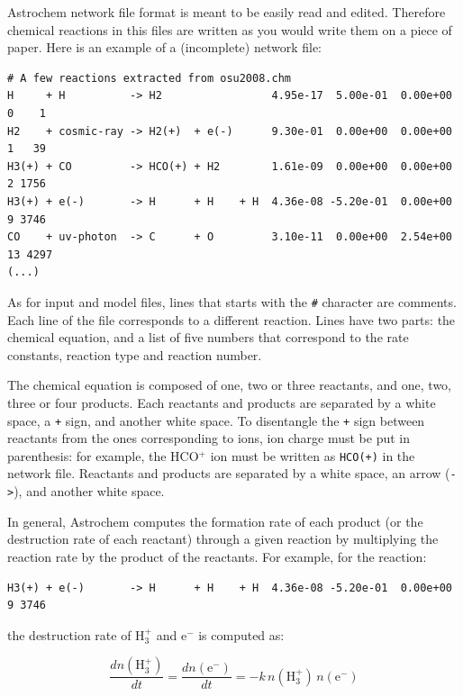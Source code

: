 \documentclass[a4paper,12pt]{article}
\newcommand{\conc}[1]{n(\mathrm{#1})}
\begin{document}
Astrochem network file format is meant to be easily read and
edited. Therefore chemical reactions in this files are written as you
would write them on a piece of paper. Here is an example of a
(incomplete) network file:

\begin{verbatim}
# A few reactions extracted from osu2008.chm
H     + H          -> H2                 4.95e-17  5.00e-01  0.00e+00  0    1
H2    + cosmic-ray -> H2(+)  + e(-)      9.30e-01  0.00e+00  0.00e+00  1   39
H3(+) + CO         -> HCO(+) + H2        1.61e-09  0.00e+00  0.00e+00  2 1756
H3(+) + e(-)       -> H      + H    + H  4.36e-08 -5.20e-01  0.00e+00  9 3746
CO    + uv-photon  -> C      + O         3.10e-11  0.00e+00  2.54e+00 13 4297
(...)
\end{verbatim}

As for input and model files, lines that starts with the \verb=#=
character are comments. Each line of the file corresponds to a
different reaction. Lines have two parts: the chemical equation, and a
list of five numbers that correspond to the rate constants, reaction
type and reaction number.

The chemical equation is composed of one, two or three reactants, and
one, two, three or four products. Each reactants and products are
separated by a white space, a \verb=+= sign, and another white
space. To disentangle the \verb=+= sign between reactants from the ones
corresponding to ions, ion charge must be put in parenthesis: for
example, the HCO$^{+}$ ion must be written as \verb=HCO(+)= in the
network file. Reactants and products are separated by a white space,
an arrow (\verb=->=), and another white space.

In general, Astrochem computes the formation rate of each product (or
the destruction rate of each reactant) through a given reaction by
multiplying the reaction rate by the product of the reactants. For
example, for the reaction:

\begin{verbatim}
H3(+) + e(-)       -> H      + H    + H  4.36e-08 -5.20e-01  0.00e+00  9 3746
\end{verbatim}

\noindent
the destruction rate of H$_{3}^{+}$ and e$^{-}$ is computed as:

\begin{equation}
  \frac{d \conc{H_{3}^{+}}}{dt} = \frac{d \conc{e^{-}}}{dt} = - k \,
  \conc{H_{3}^{+}} \, \conc{e^{-}}
\end{equation}
\end{document}
